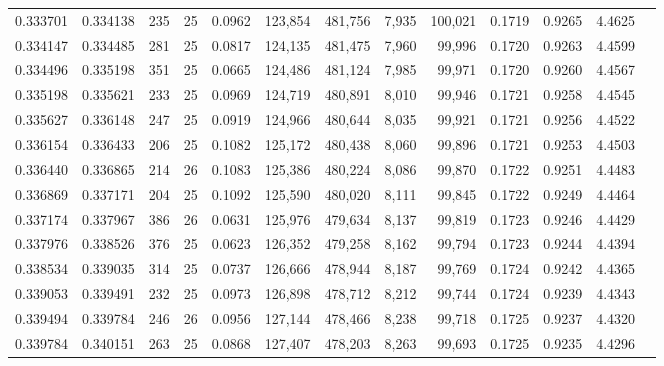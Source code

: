 \begin{tabular}{rrrrrrrrrrrrr}
0.333701 & 0.334138 & 235 &  25 &                                     0.0962 & 123,854 & 481,756 &   7,935 & 100,021 & 0.1719 & 0.9265 & 4.4625 \\
0.334147 & 0.334485 & 281 &  25 &                                     0.0817 & 124,135 & 481,475 &   7,960 &  99,996 & 0.1720 & 0.9263 & 4.4599 \\
0.334496 & 0.335198 & 351 &  25 &                                     0.0665 & 124,486 & 481,124 &   7,985 &  99,971 & 0.1720 & 0.9260 & 4.4567 \\
0.335198 & 0.335621 & 233 &  25 &                                     0.0969 & 124,719 & 480,891 &   8,010 &  99,946 & 0.1721 & 0.9258 & 4.4545 \\
0.335627 & 0.336148 & 247 &  25 &                                     0.0919 & 124,966 & 480,644 &   8,035 &  99,921 & 0.1721 & 0.9256 & 4.4522 \\
0.336154 & 0.336433 & 206 &  25 &                                     0.1082 & 125,172 & 480,438 &   8,060 &  99,896 & 0.1721 & 0.9253 & 4.4503 \\
0.336440 & 0.336865 & 214 &  26 &                                     0.1083 & 125,386 & 480,224 &   8,086 &  99,870 & 0.1722 & 0.9251 & 4.4483 \\
0.336869 & 0.337171 & 204 &  25 &                                     0.1092 & 125,590 & 480,020 &   8,111 &  99,845 & 0.1722 & 0.9249 & 4.4464 \\
0.337174 & 0.337967 & 386 &  26 &                                     0.0631 & 125,976 & 479,634 &   8,137 &  99,819 & 0.1723 & 0.9246 & 4.4429 \\
0.337976 & 0.338526 & 376 &  25 &                                     0.0623 & 126,352 & 479,258 &   8,162 &  99,794 & 0.1723 & 0.9244 & 4.4394 \\
0.338534 & 0.339035 & 314 &  25 &                                     0.0737 & 126,666 & 478,944 &   8,187 &  99,769 & 0.1724 & 0.9242 & 4.4365 \\
0.339053 & 0.339491 & 232 &  25 &                                     0.0973 & 126,898 & 478,712 &   8,212 &  99,744 & 0.1724 & 0.9239 & 4.4343 \\
0.339494 & 0.339784 & 246 &  26 &                                     0.0956 & 127,144 & 478,466 &   8,238 &  99,718 & 0.1725 & 0.9237 & 4.4320 \\
0.339784 & 0.340151 & 263 &  25 &                                     0.0868 & 127,407 & 478,203 &   8,263 &  99,693 & 0.1725 & 0.9235 & 4.4296 \\

\end{tabular}
